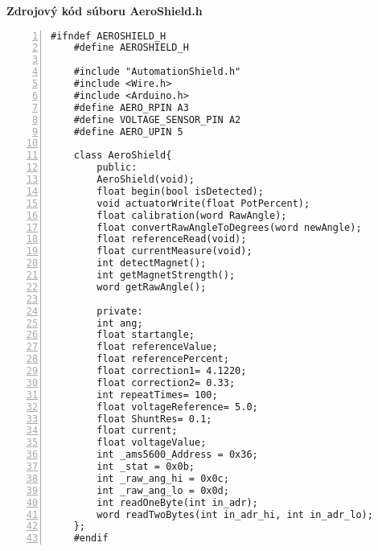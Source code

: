 \LARGE\bf{Zdrojový kód súboru AeroShield.h}
\label{AeroShield.h}
\vspace{1cm}
\begin{lstlisting}[numbers=left,basicstyle=\scriptsize,caption={Zdrojový kód súboru AeroShield.h.},captionpos=b,]	
	#ifndef AEROSHIELD_H			 
	#define AEROSHIELD_H	
	
	#include "AutomationShield.h" 
	#include <Wire.h>              
	#include <Arduino.h>			 
	#define AERO_RPIN A3        
	#define VOLTAGE_SENSOR_PIN A2   
	#define AERO_UPIN 5   
	
	class AeroShield{		    	               
		public:
		AeroShield(void);
		float begin(bool isDetected);                                       
		void actuatorWrite(float PotPercent);          
		float calibration(word RawAngle);          
		float convertRawAngleToDegrees(word newAngle);  
		float referenceRead(void);
		float currentMeasure(void);
		int detectMagnet();	
		int getMagnetStrength();
		word getRawAngle();
		
		private:
		int ang;                                        
		float startangle;                              
		float referenceValue;               
		float referencePercent;              
		float correction1= 4.1220;			
		float correction2= 0.33;			
		int repeatTimes= 100;				
		float voltageReference= 5.0;		
		float ShuntRes= 0.1;				
		float current;						
		float voltageValue;				
		int _ams5600_Address = 0x36;	
		int _stat = 0x0b;				
		int _raw_ang_hi = 0x0c;		
		int _raw_ang_lo = 0x0d;		
		int readOneByte(int in_adr);	
		word readTwoBytes(int in_adr_hi, int in_adr_lo); 
	};
	#endif
\end{lstlisting}